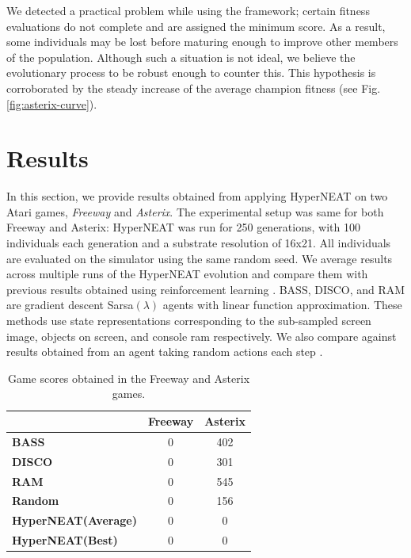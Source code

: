 \documentclass{acm_proc_article-sp}
\begin{document}
We detected a practical problem while using the framework; certain fitness evaluations do not complete and are assigned the minimum score. As a result, some individuals may be lost before maturing enough to improve other members of the population. Although such a situation is not ideal, we believe the evolutionary process to be robust enough to counter this. This hypothesis is corroborated by the steady increase of the average champion fitness (see Fig. \ref{fig:asterix-curve}). 

\section{Results}
\label{sec:results}
In this section, we provide results obtained from applying HyperNEAT on two Atari games, \textit{Freeway} and \textit{Asterix}. The experimental setup was same for both Freeway and Asterix: HyperNEAT was run for 250 generations, with 100 individuals each generation and a substrate resolution of 16x21. All individuals are evaluated on the simulator using the same random seed. We average results across multiple runs of the HyperNEAT evolution and compare them with previous results obtained using reinforcement learning \cite{naddaf10}. BASS, DISCO, and RAM are gradient descent Sarsa$(\lambda)$ agents with linear function approximation. These methods use state representations corresponding to the sub-sampled screen image, objects on screen, and console ram respectively. We also compare against results obtained from an agent taking random actions each step \cite{naddaf10}.

\begin{table}
\begin{center}
\begin{tabular}{|l|c|c|}
\hline
~ & \textbf{Freeway} & \textbf{Asterix} \\ \hline
\textbf{BASS} & 0 & 402 \\ \hline
\textbf{DISCO} & 0 & 301 \\ \hline
\textbf{RAM} & 0 & 545 \\ \hline
\textbf{Random} & 0 & 156 \\ \hline
\textbf{HyperNEAT(Average)} & 0 & 0 \\ \hline
\textbf{HyperNEAT(Best)} & 0 & 0 \\ 
\hline
\end{tabular}
\end{center}
\label{tab:results-table}
\caption{Game scores obtained in the Freeway and Asterix games.}
\end{table}
\end{document}
